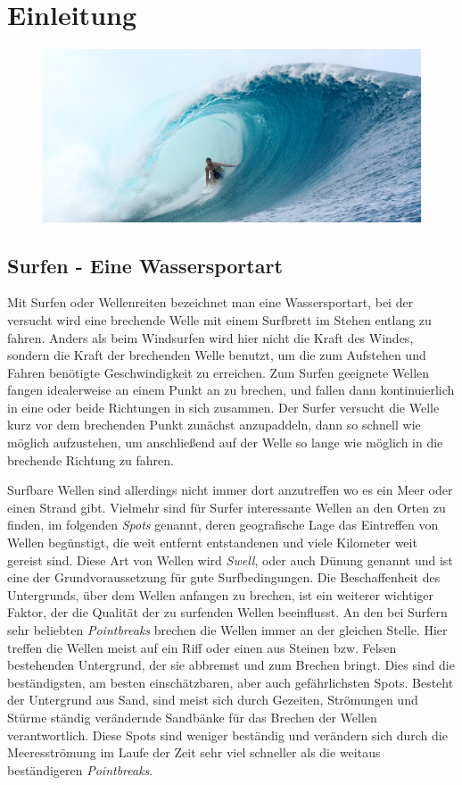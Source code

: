 
\chapter{Einleitung}

\begin{figure}[h]
  \includegraphics[width=\textwidth]{bilder/intro}
\end{figure}

\section{Surfen - Eine Wassersportart}
Mit Surfen oder Wellenreiten bezeichnet man eine Wassersportart, bei
der versucht wird eine brechende Welle mit einem Surfbrett im Stehen
entlang zu fahren. Anders als beim Windsurfen wird hier nicht die
Kraft des Windes, sondern die Kraft der brechenden Welle benutzt, um
die zum Aufstehen und Fahren benötigte Geschwindigkeit zu
erreichen. Zum Surfen geeignete Wellen fangen idealerweise an einem
Punkt an zu brechen, und fallen dann kontinuierlich in eine oder beide
Richtungen in sich zusammen. Der Surfer versucht die Welle kurz vor
dem brechenden Punkt zunächst anzupaddeln, dann so schnell wie möglich
aufzustehen, um anschließend auf der Welle so lange wie möglich in die
brechende Richtung zu fahren.

Surfbare Wellen sind allerdings nicht immer dort anzutreffen wo es ein
Meer oder einen Strand gibt. Vielmehr sind für Surfer interessante
Wellen an den Orten zu finden, im folgenden \textit{Spots} genannt,
deren geografische Lage das Eintreffen von Wellen begünstigt, die weit
entfernt entstandenen und viele Kilometer weit gereist sind. Diese Art
von Wellen wird \textit{Swell}, oder auch Dünung genannt und ist eine
der Grundvoraussetzung für gute Surfbedingungen. Die Beschaffenheit
des Untergrunds, über dem Wellen anfangen zu brechen, ist ein weiterer
wichtiger Faktor, der die Qualität der zu surfenden Wellen
beeinflusst. An den bei Surfern sehr beliebten \textit{Pointbreaks}
brechen die Wellen immer an der gleichen Stelle. Hier treffen die
Wellen meist auf ein Riff oder einen aus Steinen bzw. Felsen
bestehenden Untergrund, der sie abbremst und zum Brechen bringt. Dies
sind die beständigsten, am besten einschätzbaren, aber auch
gefährlichsten Spots. Besteht der Untergrund aus Sand, sind meist sich
durch Gezeiten, Strömungen und Stürme ständig verändernde Sandbänke
für das Brechen der Wellen verantwortlich. Diese Spots sind weniger
beständig und verändern sich durch die Meeresströmung im Laufe der
Zeit sehr viel schneller als die weitaus beständigeren
\textit{Pointbreaks}.

